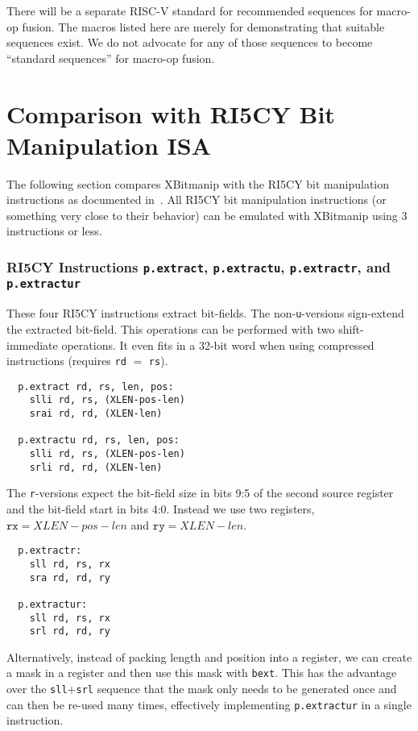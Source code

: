 There will be a separate RISC-V standard for recommended sequences for macro-op fusion.
The macros listed here are merely for demonstrating that suitable sequences exist. We
do not advocate for any of those sequences to become ``standard sequences'' for macro-op
fusion.

\section{Comparison with RI5CY Bit Manipulation ISA}

The following section compares XBitmanip with the RI5CY bit manipulation
instructions as documented in~\cite{Ri5cy}. All RI5CY bit manipulation
instructions (or something very close to their behavior) can be emulated with
XBitmanip using 3 instructions or less.

\subsubsection{RI5CY Instructions {\tt p.extract}, {\tt p.extractu}, {\tt p.extractr}, and {\tt p.extractur}}

These four RI5CY instructions extract bit-fields. The non-{\tt u}-versions sign-extend
the extracted bit-field. This operations can be performed with two shift-immediate
operations. It even fits in a 32-bit word when using compressed instructions (requires
{\tt rd} $=$ {\tt rs}).

\begin{verbatim}
  p.extract rd, rs, len, pos:
    slli rd, rs, (XLEN-pos-len)
    srai rd, rd, (XLEN-len)

  p.extractu rd, rs, len, pos:
    slli rd, rs, (XLEN-pos-len)
    srli rd, rd, (XLEN-len)
\end{verbatim}

The {\tt r}-versions expect the bit-field size in bits 9:5 of the second source
register and the bit-field start in bits 4:0. Instead we use two registers,
$\texttt{rx} = XLEN-pos-len$ and $\texttt{ry} = XLEN-len$.

\begin{verbatim}
  p.extractr:
    sll rd, rs, rx
    sra rd, rd, ry

  p.extractur:
    sll rd, rs, rx
    srl rd, rd, ry
\end{verbatim}

Alternatively, instead of packing length and position into a register, we
can create a mask in a register and then use this mask with {\tt bext}. This
has the advantage over the {\tt sll}+{\tt srl} sequence that the mask only needs
to be generated once and can then be re-used many times, effectively implementing
{\tt p.extractur} in a single instruction.

